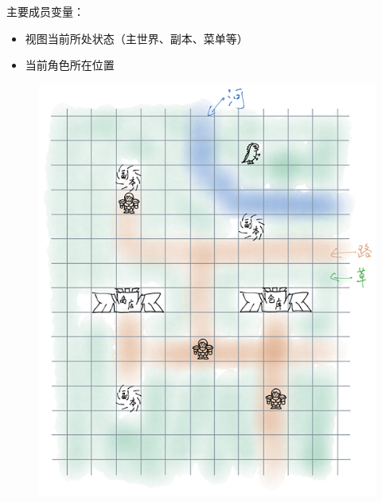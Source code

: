 \documentclass{article}
\begin{document}
\noindent{}主要成员变量：%

\begin{itemize}[noitemsep,topsep=\mdcompacttopsep]%

\item{} 视图当前所处状态（主世界、副本、菜单等）%

\item{} 当前角色所在位置%
\end{itemize}%

\begin{figure}[tbp]%
\begin{mdcenter}%

\noindent{}\includegraphics[keepaspectratio=true,width=\dimwidth{0.70}]{./img/UI}{}%

\mdhr{}%

\noindent{}%
\end{mdcenter}%
\end{figure}%
\end{document}

